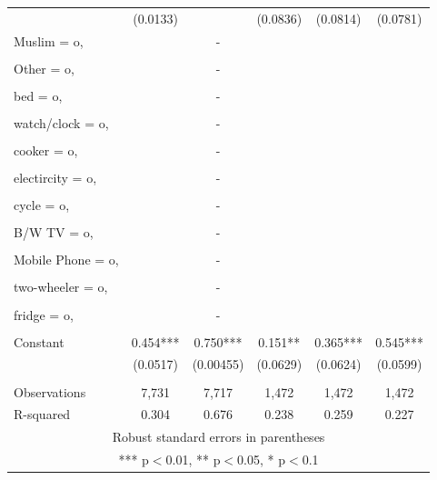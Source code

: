 \documentclass[]{article}
\begin{document}
\begin{tabular}{lccccc}
 & (0.0133) &  & (0.0836) & (0.0814) & (0.0781) \\
Muslim = o, &  & - &  &  &  \\
 &  &  &  &  &  \\
Other = o, &  & - &  &  &  \\
 &  &  &  &  &  \\
bed = o, &  & - &  &  &  \\
 &  &  &  &  &  \\
watch/clock = o, &  & - &  &  &  \\
 &  &  &  &  &  \\
cooker = o, &  & - &  &  &  \\
 &  &  &  &  &  \\
electircity = o, &  & - &  &  &  \\
 &  &  &  &  &  \\
cycle = o, &  & - &  &  &  \\
 &  &  &  &  &  \\
B/W TV = o, &  & - &  &  &  \\
 &  &  &  &  &  \\
Mobile Phone = o, &  & - &  &  &  \\
 &  &  &  &  &  \\
two-wheeler = o, &  & - &  &  &  \\
 &  &  &  &  &  \\
fridge = o, &  & - &  &  &  \\
 &  &  &  &  &  \\
Constant & 0.454*** & 0.750*** & 0.151** & 0.365*** & 0.545*** \\
 & (0.0517) & (0.00455) & (0.0629) & (0.0624) & (0.0599) \\
 &  &  &  &  &  \\
Observations & 7,731 & 7,717 & 1,472 & 1,472 & 1,472 \\
 R-squared & 0.304 & 0.676 & 0.238 & 0.259 & 0.227 \\ \hline
\multicolumn{6}{c}{ Robust standard errors in parentheses} \\
\multicolumn{6}{c}{ *** p$<$0.01, ** p$<$0.05, * p$<$0.1} \\
\end{tabular}
\end{document}
